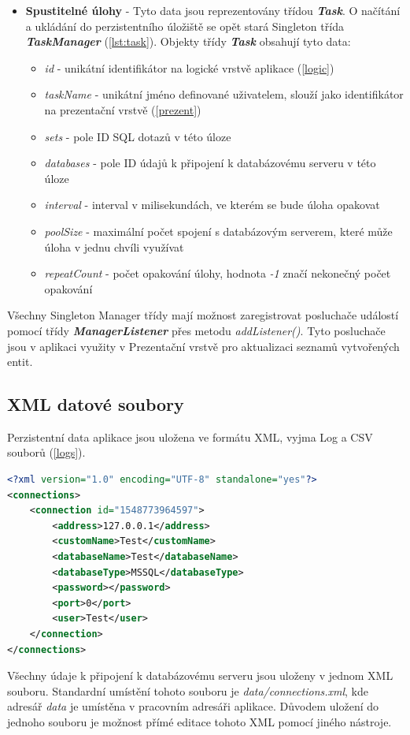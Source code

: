 \documentclass[czech,bachelor,public,dept460,male,cpdeclaration,twoside]{diploma}
\begin{document}
\begin{itemize}
  \item \textbf{Spustitelné úlohy} - Tyto data jsou reprezentovány třídou \textbf{\emph{Task}}. O načítání a ukládání do perzistentního úložiště se opět stará Singleton třída \textbf{\emph{TaskManager}} (\ref{lst:task}). Objekty třídy \textbf{\emph{Task}} obsahují tyto data:
    \begin{itemize}
  	\item \textit{id} - unikátní identifikátor na logické vrstvě aplikace (\ref{logic})
  	\item \textit{taskName} - unikátní jméno definované uživatelem, slouží jako identifikátor  na prezentační vrstvě (\ref{prezent})
  	\item \textit{sets} - pole ID SQL dotazů v této úloze
  	\item \textit{databases} - pole ID údajů k připojení k databázovému serveru v této úloze
  	\item \textit{interval} - interval v milisekundách, ve kterém se bude úloha opakovat
  	\item \textit{poolSize} - maximální počet spojení s databázovým serverem, které může úloha v jednu chvíli využívat
  	\item \textit{repeatCount} - počet opakování úlohy, hodnota \textit{-1} značí nekonečný počet opakování
    \end{itemize}
\end{itemize}

Všechny Singleton Manager třídy mají možnost zaregistrovat posluchače událostí pomocí třídy \textbf{\emph{ManagerListener}} přes metodu \textit{addListener()}. Tyto posluchače jsou v aplikaci využity v Prezentační vrstvě pro aktualizaci seznamů vytvořených entit.

\newpage
\subsection{XML datové soubory} \label{xml}
Perzistentní data aplikace jsou uložena ve formátu XML, vyjma Log a CSV souborů (\ref{logs}).\newline

\begin{minipage}{\linewidth}
\begin{lstlisting}[caption=Údaje k připojení k databázovému serveru ve formátu XML\label{lst:con},language=XML] 
<?xml version="1.0" encoding="UTF-8" standalone="yes"?>
<connections>
    <connection id="1548773964597">
        <address>127.0.0.1</address>
        <customName>Test</customName>
        <databaseName>Test</databaseName>
        <databaseType>MSSQL</databaseType>
        <password></password>
        <port>0</port>
        <user>Test</user>
    </connection>
</connections>
\end{lstlisting}
Všechny údaje k připojení k databázovému serveru jsou uloženy v jednom XML souboru. Standardní umístění tohoto souboru je \textit{data/connections.xml}, kde adresář \textit{data} je umístěna v pracovním adresáři aplikace. Důvodem uložení do jednoho souboru je možnost přímé editace tohoto XML pomocí jiného nástroje.
\end{minipage}
\end{document}
